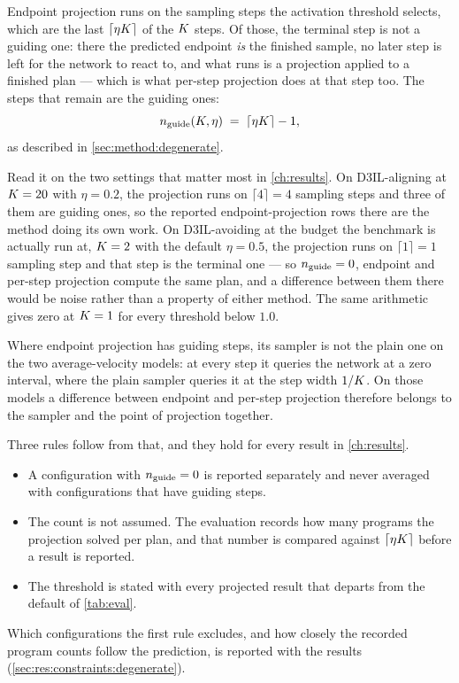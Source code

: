 Endpoint projection runs on the sampling steps the activation threshold selects, which are the last
$\lceil \eta K \rceil$ of the $K$ steps. Of those, the terminal step is not a guiding one: there the
predicted endpoint \emph{is} the finished sample, no later step is left for the network to react to, and
what runs is a projection applied to a finished plan --- which is what per-step projection does at that
step too. The steps that remain are the guiding ones:
%
\begin{equation*}
  n_{\textrm{guide}}(K,\eta) \;=\; \lceil \eta K \rceil - 1 ,
\end{equation*}
%
as described in \autoref{sec:method:degenerate}.

Read it on the two settings that matter most in \autoref{ch:results}. On D3IL-aligning at
$K=20$ with $\eta=0.2$, the projection runs on $\lceil 4 \rceil = 4$ sampling steps and three of them
are guiding ones, so the reported endpoint-projection rows there are the method doing its own work. On
D3IL-avoiding at the budget the benchmark is actually run at, $K=2$ with the default $\eta=0.5$, the
projection runs on $\lceil 1 \rceil = 1$ sampling step and that step is the terminal one --- so
$n_{\textrm{guide}}=0$, endpoint and per-step projection compute the same plan, and a difference between them
there would be noise rather than a property of either method. The same arithmetic gives zero at $K=1$
for every threshold below $1.0$.

Where endpoint projection has guiding steps, its sampler is not the plain one on the two average-velocity
models: at every step it queries the network at a zero interval, where the plain sampler queries it at
the step width $1/K$. On those models a difference between endpoint and per-step projection therefore
belongs to the sampler and the point of projection together.

Three rules follow from that, and they hold for every result in \autoref{ch:results}.

\begin{itemize}
  \item A configuration with $n_{\textrm{guide}}=0$ is reported separately and never averaged with
    configurations that have guiding steps.
  \item The count is not assumed. The evaluation records how many programs the projection solved per
    plan, and that number is compared against $\lceil \eta K \rceil$ before a result is reported.
  \item The threshold is stated with every projected result that departs from the default of
    \autoref{tab:eval}.
\end{itemize}

Which configurations the first rule excludes, and how closely the recorded program counts follow the
prediction, is reported with the results (\autoref{sec:res:constraints:degenerate}).
